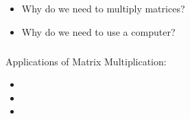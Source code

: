 \documentclass[fleqn]{beamer} %
\newcommand{\sectionIIsubsectionItitle}{}
\newcommand{\sectionIIsubsectionIItitle}{}
\begin{document}
		\subsection{\sectionIIsubsectionItitle}\label{sectionIIsubsectionI}

			\begin{frame}[label=sectionIIsubsectionI]
				\frametitle{\sectionIIsubsectionItitle}
				\bigskip

				\begin{itemize}

					\item Why do we need to multiply matrices? \vspace{20mm}\\
	
					\item Why do we need to use a computer?
	
	  			\end{itemize}
  
				\btVFill
			\end{frame}

			\begin{frame}[label=sectionIIsubsectionI]
				\frametitle{\sectionIIsubsectionItitle}
				\bigskip

				Applications of Matrix Multiplication:
				\begin{itemize}
					\item

					\item

					\item	
				\end{itemize}

				\btVFill
			\end{frame}	

			\begin{frame}[label=sectionIIsubsectionI]
				\frametitle{\sectionIIsubsectionItitle}
				\bigskip

				
				\btVFill
			\end{frame}

		\subsection{\sectionIIsubsectionIItitle}\label{sectionIIsubsectionII}
\end{document}
